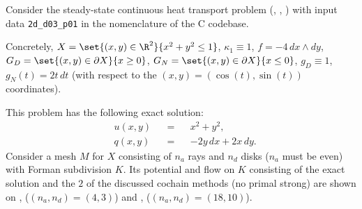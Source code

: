 \begin{example}
  \label{idec/diffusion/continuous/steady_state/examples/2d_d03_p01-example}
  Consider the steady-state continuous heat transport problem
  (,
   ,
   )
  with input data \verb|2d_d03_p01| in the nomenclature of the C codebase.

  Concretely,
    $X = \set{(x, y) \in \R^2}{x^2 + y^2 \leq 1}$,
    $\kappa_1 \equiv 1$,
    $f = - 4 \, d x \wedge d y$,
    $G_D = \set{(x, y) \in \partial X}{x \geq 0}$,
    $G_N = \set{(x, y) \in \partial X}{x \leq 0}$,
    $g_D \equiv 1$,
    $g_N(t) = 2 t \, d t$
    (with respect to the $(x, y) = (\cos(t), \sin(t))$ coordinates).

  This problem has the following exact solution:
  \begin{subequations}
    \begin{alignat}{3}
      & u(x, y) && = && x^2 + y^2, \\
      & q(x, y) && = && -2 y \, d x + 2 x \, d y.
    \end{alignat}
  \end{subequations}
  Consider a mesh $M$ for $X$ consisting of $n_a$ rays and $n_d$ disks
  ($n_a$ must be even) with Forman subdivision $K$.
  Its potential and flow on $K$ consisting of the exact solution and the $2$
  of the discussed cochain methods (no primal strong) are shown on
  ,
  ($(n_a, n_d) = (4, 3)$)
  and
  ,
  ($(n_a, n_d) = (18, 10)$).
\end{example}
